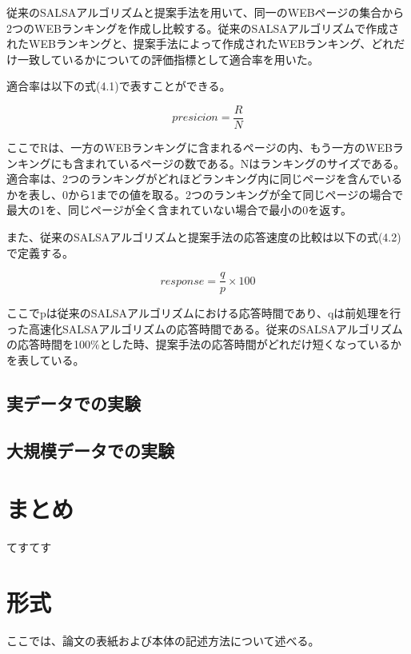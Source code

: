 \documentclass[a4paper,11pt]{jreport}
\begin{document}
従来のSALSAアルゴリズムと提案手法を用いて、同一のWEBページの集合から2つのWEBランキングを作成し比較する。従来のSALSAアルゴリズムで作成されたWEBランキングと、提案手法によって作成されたWEBランキング、どれだけ一致しているかについての評価指標として適合率を用いた。

適合率は以下の式(4.1)で表すことができる。

\begin{equation}
presicion = \frac{R}{N}
\end{equation}

ここでRは、一方のWEBランキングに含まれるページの内、もう一方のWEBランキングにも含まれているページの数である。Nはランキングのサイズである。適合率は、2つのランキングがどれほどランキング内に同じページを含んでいるかを表し、0から1までの値を取る。2つのランキングが全て同じページの場合で最大の1を、同じページが全く含まれていない場合で最小の0を返す。

また、従来のSALSAアルゴリズムと提案手法の応答速度の比較は以下の式(4.2)で定義する。

\begin{equation}
response = \frac{q}{p} \times 100
\end{equation}

ここでpは従来のSALSAアルゴリズムにおける応答時間であり、qは前処理を行った高速化SALSAアルゴリズムの応答時間である。従来のSALSAアルゴリズムの応答時間を100$\%$とした時、提案手法の応答時間がどれだけ短くなっているかを表している。

\section{実データでの実験}
\section{大規模データでの実験}

\chapter{まとめ}

てすてす

\chapter{形式}

ここでは、論文の表紙および本体の記述方法について述べる。
\end{document}
